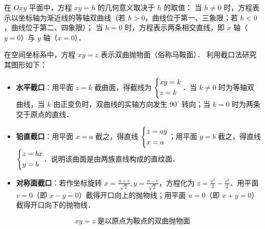 \begin{solution}

    在 $Oxy$ 平面中，方程 $xy = h$ 的几何意义取决于 $h$ 的取值：
    当 $h \neq 0$ 时，方程表示以坐标轴为渐近线的等轴双曲线（若 $h > 0$，曲线位于第一、三象限；若 $h < 0$，曲线位于第二、四象限）；
    当 $h = 0$ 时，方程表示两条相交直线，即 $x$ 轴（$y = 0$）与 $y$ 轴（$x = 0$）．


    在空间坐标系中，方程 $xy = z$ 表示双曲抛物面（俗称马鞍面）．
    利用截口法研究其图形如下：
    \begin{itemize}
        \item \textbf{水平截口}：用平面 $z = k$ 截曲面，得截线为 $\begin{dcases} xy = k \\ z = k \end{dcases}$．当 $k \neq 0$ 时为等轴双曲线，当 $k$ 由正变负时，双曲线的实轴方向发生 $90^\circ$ 转向；当 $k = 0$ 时为两条交于原点的直线．
        \item \textbf{铅直截口}：用平面 $x = a$ 截之，得直线 $\begin{dcases} z = ay \\ x = a \end{dcases}$；用平面 $y = b$ 截之，得直线 $\begin{dcases} z = bx \\ y = b \end{dcases}$．说明该曲面是由两族直线构成的直纹面．
        \item \textbf{对称面截口}：若作坐标旋转 $x = \frac{u+v}{\sqrt{2}}, y = \frac{u-v}{\sqrt{2}}$，方程化为 $z = \frac{u^2}{2} - \frac{v^2}{2}$．用平面 $v = 0$（即 $x-y=0$）截得开口向上的抛物线；用平面 $u = 0$（即 $x+y=0$）截得开口向下的抛物线．
    \end{itemize}
    \begin{equation}
        \boxed{xy = z \text{ 是以原点为鞍点的双曲抛物面}}
    \end{equation}
\end{solution}

\endinput
